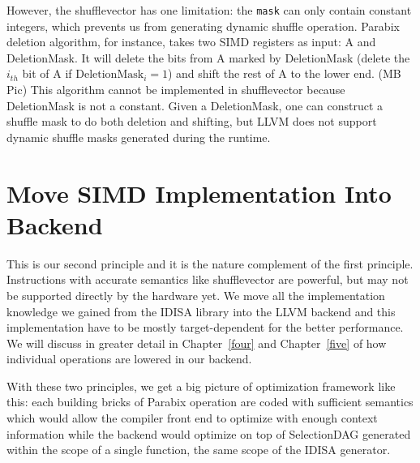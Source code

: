 However, the shufflevector has one limitation: the {\tt mask} can only contain constant integers, which prevents us from generating dynamic shuffle operation. Parabix deletion algorithm, for instance, takes two SIMD registers as input: A and DeletionMask. It will delete the bits from A marked by DeletionMask (delete the $i_{th}$ bit of A if $\text{DeletionMask}_i = 1$) and shift the rest of A to the lower end. (MB Pic) This algorithm cannot be implemented in shufflevector because DeletionMask is not a constant. Given a DeletionMask, one can construct a shuffle mask to do both deletion and shifting, but LLVM does not support dynamic shuffle masks generated during the runtime.

\section{Move SIMD Implementation Into Backend}

This is our second principle and it is the nature complement of the first principle. Instructions with accurate semantics like shufflevector are powerful, but may not be supported directly by the hardware yet. We move all the implementation knowledge we gained from the IDISA library into the LLVM backend and this implementation have to be mostly target-dependent for the better performance. We will discuss in greater detail in Chapter~\ref{four} and Chapter~\ref{five} of how individual operations are lowered in our backend.

With these two principles, we get a big picture of optimization framework like this: each building bricks of Parabix operation are coded with sufficient semantics which would allow the compiler front end to optimize with enough context information while the backend would optimize on top of SelectionDAG generated within the scope of a single function, the same scope of the IDISA generator.

